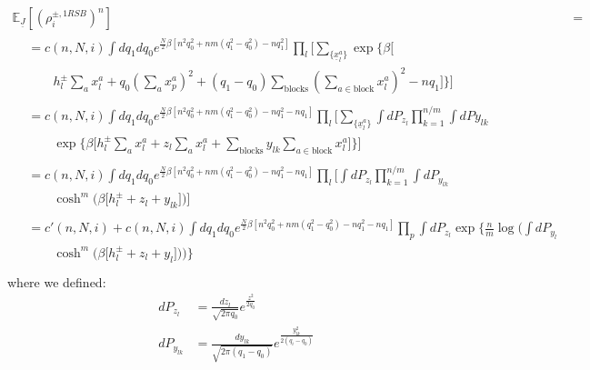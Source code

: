 \documentclass[aps,physrev,10pt,floatfix,longbibliography,nofootinbib,reprint]{revtex4-2}
\begin{document}
\begin{align}
\mathbb{E}_{\underline{J}} \left[(\rho_i^{\pm, 1RSB})^n \right] &=&  \\[1ex]
\begin{split}
& = c(n,N,i) \int dq_1 dq_0 e^{\frac{N}{2}\beta\left[n^2 q_0^2 + nm(q_1^2 - q_0^2) -n q_1^2\right]} 
\prod_{l} \biggl[ \sum_{\{\underline{x}^{a}_l\}} \exp\biggl\{\beta \bigl[ \\ 
 & \qquad h_l^{\pm} \sum_{a} x_l^{a} +q_0 \left( \sum_{a} x_p^{a} \right)^2 + (q_1-q_0) \sum_{\text{blocks}} \left( \sum_{a \in \text{block}}x_l^{a}\right)^2  -nq_1 \bigl]  \biggr\}  \biggr] 
\end{split}\\ 
\begin{split}
& = c(n,N,i) \int dq_1 dq_0 e^{\frac{N}{2}\beta\left[n^2 q_0^2 + nm(q_1^2 - q_0^2) -n q_1^2 -n q_1\right]} 
\prod_{l} \biggl[ \sum_{\{\underline{x}^{a}_l\}} \int dP_{z_l} \prod_{k=1}^{n/m} \int dP{y_{lk}} \\ 
 &  \qquad  \exp\biggl\{\beta \bigl[h_l^{\pm} \sum_{a} x_l^{a} +  z_l \sum_{a}x_l^{a} + \sum_{\text{blocks}}  y_{lk} \sum_{a \in \text{block}}x_l^{a}\bigl]  \biggr\}  \biggr] 
\end{split}\\ 
\begin{split}
& = c(n,N,i) \int dq_1 dq_0 e^{\frac{N}{2}\beta\left[n^2 q_0^2 + nm(q_1^2 - q_0^2) -n q_1^2 -n q_1\right]} 
\prod_{l} \biggl[ \int dP_{z_l}  \prod_{k=1}^{n/m} \int dP_{y_{lk}}\\ 
 &  \qquad  \cosh^m\biggl(\beta \bigl[h_l^{\pm}+  z_l +y_{lk}\bigl]  \biggr)  \biggr]
\end{split}\\ 
\begin{split}
& = c'(n,N,i) + c(n,N,i) \int dq_1 dq_0 e^{\frac{N}{2}\beta\left[n^2 q_0^2 + nm(q_1^2 - q_0^2) -n q_1^2 -n q_1\right]} 
\prod_{p} \int dP_{z_l}  \exp \biggl\{ \frac{n}{m} \log \biggl( \int dP_{y_{l}}\\ 
 &  \qquad  \cosh^m\biggl(\beta \bigl[h_l^{\pm}+ z_l + y_{l}\bigl]  \biggr)  \biggr) \biggr\}
\end{split}\\ 
\end{align}
where we defined:
\begin{align}
    dP_{z_l} & = \frac{dz_l}{\sqrt{2\pi q_0}}e^{\frac{z^2}{2q_0}}\\
    dP_{y_{lk}} & = \frac{dy_{lk}}{\sqrt{2\pi (q_1-q_0)}}e^{\frac{y_{lk}^2}{2 (q_i-q_0)}}
\end{align}
\end{document}
